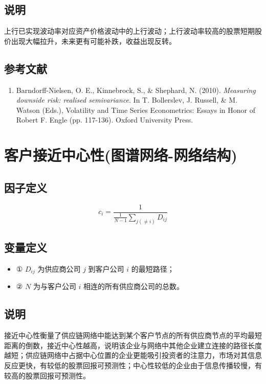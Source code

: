 \documentclass{article}
\begin{document}
\subsection{说明}
上行已实现波动率对应资产价格波动中的上行波动；上行波动率较高的股票短期股价出现大幅拉升，未来更有可能补跌，收益出现反转。

\subsection{参考文献}
\begin{enumerate}
    \item Barndorff-Nielsen, O. E., Kinnebrock, S., \& Shephard, N. (2010). \textit{Measuring downside risk: realised semivariance}. In T. Bollerslev, J. Russell, \& M. Watson (Eds.), Volatility and Time Series Econometrics: Essays in Honor of Robert F. Engle (pp. 117-136). Oxford University Press.
\end{enumerate}

\section{客户接近中心性(图谱网络-网络结构)}

\subsection{因子定义}
\begin{equation}
    c_i = \frac{1}{\frac{1}{N-1} \sum_{j(\neq i)} D_{ij}}
\end{equation}

\subsection{变量定义}
\begin{itemize}
    \item ① \( D_{ij} \) 为供应商公司 \( j \) 到客户公司 \( i \) 的最短路径；
    \item ② \( N \) 为与客户公司 \( i \) 相连的所有供应商公司的总数。
\end{itemize}

\subsection{说明}
接近中心性衡量了供应链网络中能达到某个客户节点的所有供应商节点的平均最短距离的倒数，接近中心性越高，说明该企业与网络中其他企业建立连接的路径长度越短；供应链网络中占据中心位置的企业更能吸引投资者的注意力，市场对其信息反应更快，有较低的股票回报可预测性；中心性较低的企业由于信息传播较慢，有较高的股票回报可预测性。
\end{document}
